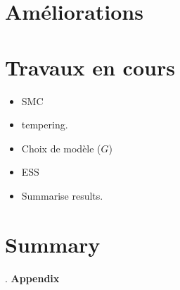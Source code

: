 \documentclass{beamer}
\newcommand{\fr}[1]{#1}
\newcommand{\en}[1]{}
\begin{document}
\section{\en{Improvements}\fr{Améliorations}}

\section{\en{Work in progress}\fr{Travaux en cours}}
\begin{frame}
\begin{itemize}
\item SMC
\item tempering.
\item \fr{Choix de modèle}\en{Model choice} ($G$)
\item ESS
\item Summarise results.
\end{itemize}
\end{frame}

\section{Summary}




\begin{frame}[allowframebreaks]

\nocite{*}
 

 

\end{frame} 

\begin{frame}{.}
{\Huge\bf Appendix}
\appendix
\end{frame}
\end{document}

